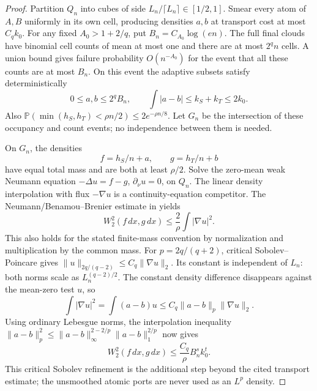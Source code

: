 \documentclass[11pt,reqno]{amsart}
\theoremstyle{definition}
\theoremstyle{remark}
\numberwithin{equation}{section}
\newcommand{\Pp}{\mathbb P}
\begin{document}
\begin{proof}
Partition \(Q_n\) into cubes of side
\(L_n/\lceil L_n\rceil\in[1/2,1]\). Smear every atom of
\(A,B\) uniformly in its own cell, producing densities \(a,b\)
at transport cost at most \(C_qk_0\).
For any fixed \(A_0>1+2/q\), put
\(B_n=C_{A_0}\log(en)\). The full final clouds have binomial
cell counts of mean at most one and there are at most \(2^qn\)
cells. A union bound gives failure probability \(O(n^{-A_0})\)
for the event that all these counts are at most \(B_n\).
On this event the adaptive subsets satisfy deterministically
\[
0\le a,b\le2^qB_n,\qquad
\int|a-b|\le k_S+k_T\le2k_0.
\]
Also
\(\Pp(\min(h_S,h_T)<\rho n/2)\le2e^{-\rho n/8}\).
Let \(G_n\) be the intersection of these occupancy and count
events; no independence between them is needed.

On \(G_n\), the densities
\[
f=h_S/n+a,\qquad g=h_T/n+b
\]
have equal total mass and are both at least \(\rho/2\).
Solve the zero-mean weak Neumann equation
\(-\Delta u=f-g\), \(\partial_\nu u=0\), on \(Q_n\).
The linear density interpolation with flux \(-\nabla u\) is a
continuity-equation competitor. The Neumann/Benamou--Brenier estimate
in \cite[proof of Lemma~3.4]{GoldmanTrevisan2021} yields
\[
W_2^2(f\,dx,g\,dx)\le\frac2\rho\int|\nabla u|^2.
\]
This also holds for the stated finite-mass convention by normalization
and multiplication by the common mass. For
\(p=2q/(q+2)\), critical Sobolev--Poincare gives
\(\|u\|_{2q/(q-2)}\le C_q\|\nabla u\|_2\).
Its constant is independent of \(L_n\): both norms scale as
\(L_n^{(q-2)/2}\). The constant density difference disappears
against the mean-zero test \(u\), so
\[
\int|\nabla u|^2=\int(a-b)u
 \le C_q\|a-b\|_p\|\nabla u\|_2.
\]
Using ordinary Lebesgue norms, the interpolation inequality
\(\|a-b\|_p^2\le
\|a-b\|_\infty^{2-2/p}\|a-b\|_1^{2/p}\) now gives
\[
W_2^2(f\,dx,g\,dx)
 \le\frac{C_q}{\rho}B_n^s k_0^t.
\]
This critical Sobolev refinement is the additional step beyond the
cited transport estimate; the unsmoothed atomic ports are never used
as an \(L^p\) density.


\end{proof}
\end{document}
